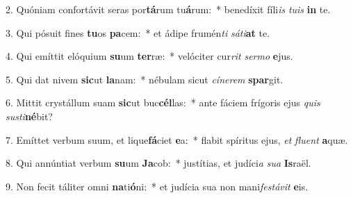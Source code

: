2. Quóniam confortávit seras por\textbf{tá}rum tu\textbf{á}rum:~*  benedíxit fíli\textit{is} \textit{tu}\textit{is} \textbf{in} te.\

3. Qui pósuit fines \textbf{tu}os \textbf{pa}cem:~*  et ádipe frumén\textit{ti} \textit{sá}\textit{ti}\textbf{at} te.\

4. Qui emíttit elóquium \textbf{su}um \textbf{ter}ræ:~*  velóciter cur\textit{rit} \textit{ser}\textit{mo} \textbf{e}jus.\

5. Qui dat nivem \textbf{sic}ut \textbf{la}nam:~*  nébulam sicut \textit{cí}\textit{ne}\textit{rem} \textbf{spar}git.\

6. Mittit crystállum suam \textbf{sic}ut buc\textbf{cél}las:~*  ante fáciem frígoris ejus \textit{quis} \textit{sus}\textit{ti}\textbf{né}bit?\

7. Emíttet verbum suum, et lique\textbf{fá}ciet \textbf{e}a:~*  flabit spíritus ejus, \textit{et} \textit{flu}\textit{ent} \textbf{a}quæ.\

8. Qui annúntiat verbum \textbf{su}um \textbf{Ja}cob:~*  justítias, et judíci\textit{a} \textit{su}\textit{a} \textbf{Is}raël.\

9. Non fecit táliter omni \textbf{na}ti\textbf{ó}ni:~*  et judícia sua non mani\textit{fes}\textit{tá}\textit{vit} \textbf{e}is.\

